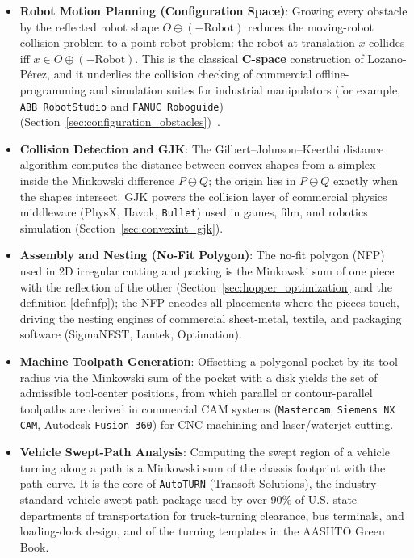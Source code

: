 \begin{itemize}
\item \textbf{Robot Motion Planning (Configuration Space)}: Growing every
  obstacle by the reflected robot shape $O \oplus (-\text{Robot})$ reduces the
  moving-robot collision problem to a point-robot problem: the robot at
  translation $x$ collides iff $x \in O \oplus (-\text{Robot})$. This is the
  classical \textbf{C-space} construction of Lozano-P\'erez, and it underlies
  the collision checking of commercial offline-programming and simulation
  suites for industrial manipulators (for example, \texttt{ABB RobotStudio}
  and \texttt{FANUC Roboguide})
  (Section~\ref{sec:configuration_obstacles})~\cite{lozanoperez1983}.

\item \textbf{Collision Detection and GJK}: The Gilbert--Johnson--Keerthi
  distance algorithm computes the distance between convex shapes from a
  simplex inside the Minkowski difference $P \ominus Q$; the origin lies in
  $P \ominus Q$ exactly when the shapes intersect. GJK powers the collision
  layer of commercial physics middleware (PhysX, Havok, \texttt{Bullet}) used
  in games, film, and robotics simulation
  (Section~\ref{sec:convexint_gjk}).

\item \textbf{Assembly and Nesting (No-Fit Polygon)}: The no-fit polygon
  (NFP) used in 2D irregular cutting and packing is the Minkowski sum of one
  piece with the reflection of the other (Section~\ref{sec:hopper_optimization}
  and the definition \ref{def:nfp});
  the NFP encodes all placements where the pieces touch, driving the nesting
  engines of commercial sheet-metal, textile, and packaging software
  (SigmaNEST, Lantek, Optimation).

\item \textbf{Machine Toolpath Generation}: Offsetting a polygonal pocket by
  its tool radius via the Minkowski sum of the pocket with a disk yields the
  set of admissible tool-center positions, from which parallel or
  contour-parallel toolpaths are derived in commercial CAM systems
  (\texttt{Mastercam}, \texttt{Siemens NX CAM}, Autodesk \texttt{Fusion 360})
  for CNC machining and laser/waterjet cutting.

\item \textbf{Vehicle Swept-Path Analysis}: Computing the swept region of a
  vehicle turning along a path is a Minkowski sum of the chassis footprint
  with the path curve. It is the core of \texttt{AutoTURN} (Transoft
  Solutions), the industry-standard vehicle swept-path package used by over
  90\% of U.S. state departments of transportation for truck-turning
  clearance, bus terminals, and loading-dock design, and of the turning
  templates in the AASHTO Green Book.


\end{itemize}
